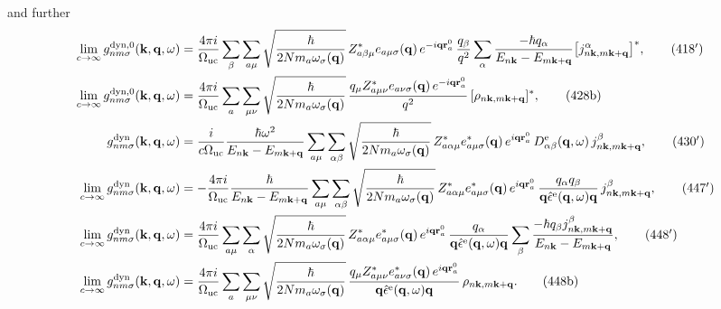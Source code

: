 and further
\begin{align}
\lim_{c\to\infty}g^{\rm dyn,0}_{nm\sigma}(\mathbf k,\mathbf q,\omega)&=\frac{4\pi i}{\Omega_{\rm uc}}\sum_\beta\sum_{a\mu}\sqrt{\frac{\hbar}{2Nm_a\omega_\sigma(\mathbf q)}}\,Z^*_{a\beta\mu}e_{a\mu\sigma}(\mathbf q)\,e^{-i\mathbf q\mathbf r^0_a}\,\frac{q_\beta}{q^2}\sum_\alpha\frac{-\hbar q_\alpha}{E_{n\mathbf k}-E_{m\mathbf k+\mathbf q}}\big[j^\alpha_{n\mathbf k,m\mathbf k+\mathbf q}\big]^*,\tag{418$'$}\\
\lim_{c\to\infty}g^{\rm dyn,0}_{nm\sigma}(\mathbf k,\mathbf q,\omega)&=\frac{4\pi i}{\Omega_{\rm uc}}\sum_a\sum_{\mu\nu}\sqrt{\frac{\hbar}{2Nm_a\omega_\sigma(\mathbf q)}}\,\frac{q_\mu Z^*_{a\mu\nu}e_{a\nu\sigma}(\mathbf q)\,e^{-i\mathbf q\mathbf r^0_a}}{q^2}\,[\rho_{n\mathbf k,m\mathbf k+\mathbf q}]^*,\tag{428b}\\
g^{\rm dyn}_{nm\sigma}(\mathbf k,\mathbf q,\omega)&=\frac{i}{c\Omega_{\rm uc}}\frac{\hbar\omega^2}{E_{n\mathbf k}-E_{m\mathbf k+\mathbf q}}\sum_{a\mu}\sum_{\alpha\beta}\sqrt{\frac{\hbar}{2Nm_a\omega_\sigma(\mathbf q)}}\,Z^*_{a\alpha\mu}e^*_{a\mu\sigma}(\mathbf q)\,e^{i\mathbf q\mathbf r^0_a}\,D^{\rm e}_{\alpha\beta}(\mathbf q,\omega)\,j^\beta_{n\mathbf k,m\mathbf k+\mathbf q},\tag{430$'$}\\
\lim_{c\to\infty}g^{\rm dyn}_{nm\sigma}(\mathbf k,\mathbf q,\omega)&=-\frac{4\pi i}{\Omega_{\rm uc}}\frac{\hbar}{E_{n\mathbf k}-E_{m\mathbf k+\mathbf q}}\sum_{a\mu}\sum_{\alpha\beta}\sqrt{\frac{\hbar}{2Nm_a\omega_\sigma(\mathbf q)}}\,Z^*_{a\alpha\mu}e^*_{a\mu\sigma}(\mathbf q)\,e^{i\mathbf q\mathbf r^0_a}\,\frac{q_\alpha q_\beta}{\mathbf q\hat\epsilon^{\rm e}(\mathbf q,\omega)\mathbf q}\,j^\beta_{n\mathbf k,m\mathbf k+\mathbf q},\tag{447$'$}\\
\lim_{c\to\infty}g^{\rm dyn}_{nm\sigma}(\mathbf k,\mathbf q,\omega)&=\frac{4\pi i}{\Omega_{\rm uc}}\sum_{a\mu}\sum_\alpha\sqrt{\frac{\hbar}{2Nm_a\omega_\sigma(\mathbf q)}}\,Z^*_{a\alpha\mu}e^*_{a\mu\sigma}(\mathbf q)\,e^{i\mathbf q\mathbf r^0_a}\,\frac{q_\alpha}{\mathbf q\hat\epsilon^{\rm e}(\mathbf q,\omega)\mathbf q}\sum_\beta\frac{-\hbar q_\beta j^\beta_{n\mathbf k,m\mathbf k+\mathbf q}}{E_{n\mathbf k}-E_{m\mathbf k+\mathbf q}},\tag{448$'$}\\
\lim_{c\to\infty}g^{\rm dyn}_{nm\sigma}(\mathbf k,\mathbf q,\omega)&=\frac{4\pi i}{\Omega_{\rm uc}}\sum_a\sum_{\mu\nu}\sqrt{\frac{\hbar}{2Nm_a\omega_\sigma(\mathbf q)}}\,\frac{q_\mu Z^*_{a\mu\nu}e^*_{a\nu\sigma}(\mathbf q)\,e^{i\mathbf q\mathbf r^0_a}}{\mathbf q\hat\epsilon^{\rm e}(\mathbf q,\omega)\mathbf q}\,\rho_{n\mathbf k,m\mathbf k+\mathbf q}.\tag{448b}
\end{align}
